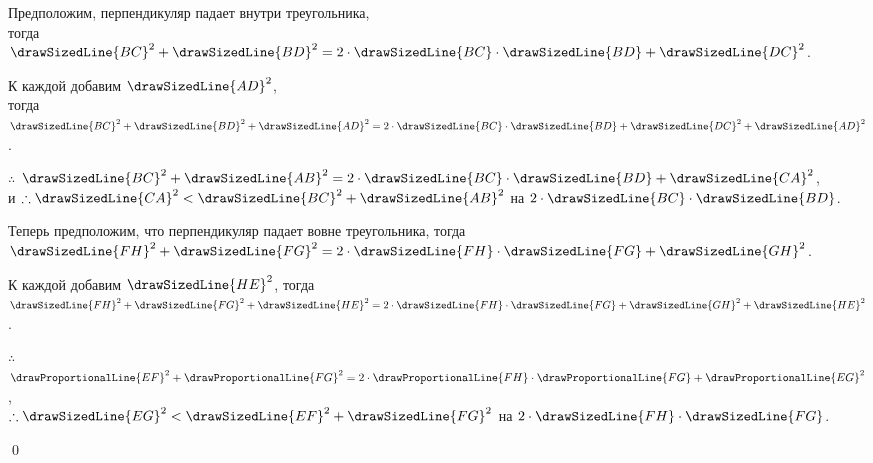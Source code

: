 \documentclass[letters,booklanguage=russian]{byrnebook}
\begin{document}
\begin{center}
Предположим, перпендикуляр падает внутри треугольника,\\
тогда  \\
$\drawSizedLine{BC}^2 + \drawSizedLine{BD}^2 = 2 \cdot \drawSizedLine{BC} \cdot \drawSizedLine{BD} + \drawSizedLine{DC}^2$.

К каждой добавим $\drawSizedLine{AD}^2$,\\
тогда $\drawSizedLine{BC}^2 + \drawSizedLine{BD}^2 + \drawSizedLine{AD}^2 = 2 \cdot \drawSizedLine{BC} \cdot \drawSizedLine{BD} + \drawSizedLine{DC}^2 + \drawSizedLine{AD}^2$.

$\therefore$ 
$\drawSizedLine{BC}^2 + \drawSizedLine{AB}^2 = 2 \cdot \drawSizedLine{BC} \cdot \drawSizedLine{BD} + \drawSizedLine{CA}^2$,\\
и $\therefore \drawSizedLine{CA}^2 < \drawSizedLine{BC}^2 + \drawSizedLine{AB}^2$ на $2 \cdot \drawSizedLine{BC} \cdot \drawSizedLine{BD}$.

Теперь предположим, что перпендикуляр падает вовне треугольника, тогда \\
$\drawSizedLine{FH}^2 + \drawSizedLine{FG}^2 = 2 \cdot \drawSizedLine{FH} \cdot \drawSizedLine{FG} + \drawSizedLine{GH}^2$.

К каждой добавим $\drawSizedLine{HE}^2$, тогда\\
$\drawSizedLine{FH}^2 + \drawSizedLine{FG}^2 + \drawSizedLine{HE}^2= 2 \cdot \drawSizedLine{FH} \cdot \drawSizedLine{FG} + \drawSizedLine{GH}^2 + \drawSizedLine{HE}^2$.

$\therefore$ 
$\drawProportionalLine{EF}^2 + \drawProportionalLine{FG}^2 = 2 \cdot \drawProportionalLine{FH} \cdot \drawProportionalLine{FG} + \drawProportionalLine{EG}^2$,\\

$\therefore \drawSizedLine{EG}^2 < \drawSizedLine{EF}^2 + \drawSizedLine{FG}^2$ на $2 \cdot \drawSizedLine{FH} \cdot \drawSizedLine{FG}$.
\end{center}

\qed
\end{document}
